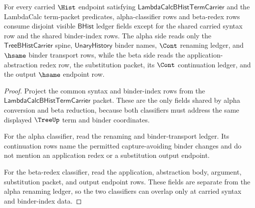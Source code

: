 \begin{theorem}
\label{thm:lambdacalc-alpha-beta-ledger-separation}
For every carried $\Hist$ endpoint satisfying
$\mathsf{LambdaCalcBHistTermCarrier}$ and the LambdaCalc term-packet
predicates, alpha-classifier rows and beta-redex rows consume disjoint visible
$\mathsf{BHist}$ ledger fields except for the shared carried syntax row and
the shared binder-index rows. The alpha side reads only the
$\mathsf{TreeBHistCarrier}$ spine, $\mathsf{UnaryHistory}$ binder names,
$\Cont$ renaming ledger, and $\hsame$ binder transport rows, while the beta
side reads the application-abstraction redex row, the substitution packet, its
$\Cont$ continuation ledger, and the output $\hsame$ endpoint row.
\end{theorem}
\begin{proof}
Project the common syntax and binder-index rows from the
$\mathsf{LambdaCalcBHistTermCarrier}$ packet. These are the only fields shared
by alpha conversion and beta reduction, because both classifiers must address
the same displayed $\TreeUp$ term and binder coordinates.

For the alpha classifier, read the renaming and binder-transport ledger. Its
continuation rows name the permitted capture-avoiding binder changes and do
not mention an application redex or a substitution output endpoint.

For the beta-redex classifier, read the application, abstraction body,
argument, substitution packet, and output endpoint rows. These fields are
separate from the alpha renaming ledger, so the two classifiers can overlap
only at carried syntax and binder-index data.
\end{proof}

